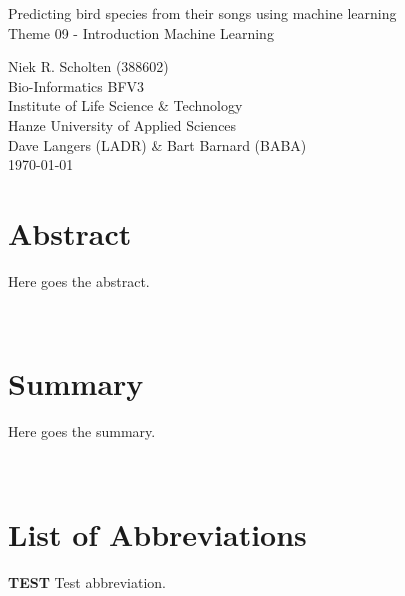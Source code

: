 \begin{center}


    \Huge{Predicting bird species from their songs using machine learning}\\
    \vspace{\baselineskip}
    \LARGE{Theme 09 - Introduction Machine Learning}\\
    \vspace{\baselineskip}

\end{center}
\vspace{\baselineskip}

\normalsize
\vspace*{\fill}
\begin{flushright}
    Niek R. Scholten (388602)\\
    Bio-Informatics BFV3\\
    Institute of Life Science \& Technology\\
    Hanze University of Applied Sciences\\
    Dave Langers (LADR) \& Bart Barnard (BABA)\\
    \today
\end{flushright}
\newpage

\section*{Abstract}

Here goes the abstract.

\label{sec:abstract}~
\newpage

\section*{Summary}

Here goes the summary.

\label{sec:summ}~
\newpage

\section*{List of Abbreviations}

\textbf{TEST} Test abbreviation.

\label{sec:abvs}~

\newpage